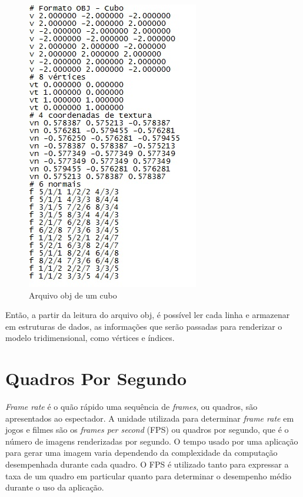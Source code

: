 \begin{description}
	\begin{figure}[h]
	\centering
		\includegraphics[keepaspectratio=true,scale=0.9]{figuras/obj.jpg}
	\caption{Arquivo obj de um cubo}
	\label{objFile}
	\end{figure}

	Então, a partir da leitura do arquivo obj, é possível ler cada linha e armazenar em estruturas de dados, as informações que serão passadas para renderizar o modelo tridimensional, como vértices e índices. 

\end{description}

\section{Quadros Por Segundo}

	\textit{Frame rate} é o quão rápido uma sequência de \textit{frames}, ou quadros, são apresentados ao espectador. A unidade utilizada para determinar \textit{frame rate} em jogos e filmes são os \textit{frames per second} (FPS) ou quadros por segundo, que é o número de imagens renderizadas por segundo. O tempo usado por uma aplicação para gerar uma imagem varia dependendo da complexidade da computação desempenhada durante cada quadro.  O FPS é utilizado tanto para expressar a taxa de um quadro em particular quanto para determinar o desempenho médio durante o uso da aplicação. 

